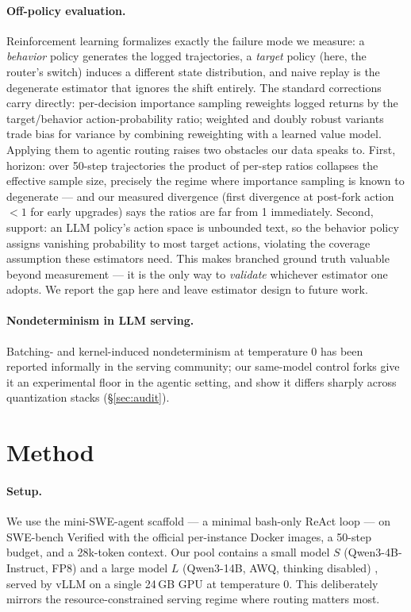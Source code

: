 \documentclass{article}
\begin{document}
\paragraph{Off-policy evaluation.} Reinforcement learning formalizes exactly the failure mode we measure: a \emph{behavior} policy generates the logged trajectories, a \emph{target} policy (here, the router's switch) induces a different state distribution, and naive replay is the degenerate estimator that ignores the shift entirely. The standard corrections carry directly: per-decision importance sampling \citep{precup2000eligibility} reweights logged returns by the target/behavior action-probability ratio; weighted and doubly robust variants \citep{jiang2016doubly,thomas2016dataefficient} trade bias for variance by combining reweighting with a learned value model. Applying them to agentic routing raises two obstacles our data speaks to. First, horizon: over 50-step trajectories the product of per-step ratios collapses the effective sample size, precisely the regime where importance sampling is known to degenerate --- and our measured divergence (first divergence at post-fork action ${<}1$ for early upgrades) says the ratios are far from 1 immediately. Second, support: an LLM policy's action space is unbounded text, so the behavior policy assigns vanishing probability to most target actions, violating the coverage assumption these estimators need. This makes branched ground truth valuable beyond measurement --- it is the only way to \emph{validate} whichever estimator one adopts. We report the gap here and leave estimator design to future work.

\paragraph{Nondeterminism in LLM serving.} Batching- and kernel-induced nondeterminism at temperature 0 has been reported informally in the serving community; our same-model control forks give it an experimental floor in the agentic setting, and show it differs sharply across quantization stacks (\S\ref{sec:audit}).

\section{Method}\label{sec:method}

\paragraph{Setup.} We use the mini-SWE-agent scaffold \citep{minisweagent} --- a minimal bash-only ReAct loop --- on SWE-bench Verified \citep{jimenez2024swebench} with the official per-instance Docker images, a 50-step budget, and a 28k-token context. Our pool contains a small model $S$ (Qwen3-4B-Instruct, FP8) and a large model $L$ (Qwen3-14B, AWQ, thinking disabled) \citep{qwen3}, served by vLLM \citep{kwon2023vllm} on a single 24\,GB GPU at temperature 0. This deliberately mirrors the resource-constrained serving regime where routing matters most.
\end{document}

